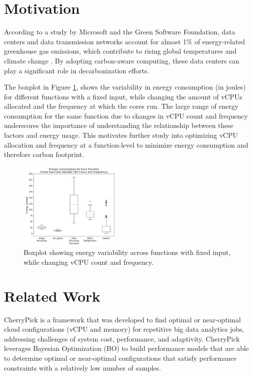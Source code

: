 \documentclass[times, 10pt,twocolumn]{article}
\begin{document}
\section{Motivation}

According to a study by Microsoft and the Green Software Foundation, data centers and data transmission networks account for almost 1\% of energy-related greenhouse gas emissions, which contribute to rising global temperatures and climate change \cite{carbon_aware_computing}. By adopting carbon-aware computing, these data centers can play a significant role in decarbonization efforts. 

The boxplot in Figure \ref{fig:energy_boxplot}, 
shows the variability in energy consumption (in joules) for different functions with a fixed input, while changing the amount of vCPUs allocated and the frequency at which the cores run. The large range of energy consumption for the same function due to changes in vCPU count and frequency underscores the importance of understanding the relationship between these factors and energy usage. This motivates further study into optimizing vCPU allocation and frequency at a function-level to minimize energy consumption and therefore carbon footprint. 


\begin{figure}[ht]
   \centering
   \includegraphics[width=0.45\textwidth]{imgs/energy_boxplot.png}
   \caption{Boxplot showing energy variability across functions with fixed input, while changing vCPU count and frequency. }
   \label{fig:energy_boxplot}
 \end{figure}
\section{Related Work}
CherryPick \cite{CherryPick} is a framework that was developed to find optimal or near-optimal cloud configurations (vCPU and memory) for repetitive big data analytics jobs, addressing challenges of system cost, performance, and adaptivity. CherryPick leverages Bayesian Optimization (BO) to build performance models that are able to determine optimal or near-optimal configurations that satisfy performance constraints with a relatively low number of samples. 
\end{document}

